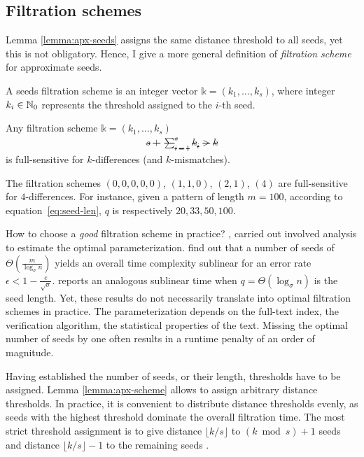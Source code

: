 \subsection{Filtration schemes}

Lemma \ref{lemma:apx-seeds} assigns the same distance threshold to all seeds, yet this is not obligatory.
Hence, I give a more general definition of \emph{filtration scheme} for approximate seeds.
\begin{definition}
A seeds filtration scheme is an integer vector $\mathbb{k} = (k_1, \dots, k_s)$, where integer $k_i \in \mathbb {N}_0$ represents the threshold assigned to the $i$-th seed.
\end{definition}

\begin{lemma}
\label{lemma:apx-scheme}
Any filtration scheme $\mathbb{k} = (k_1, \dots, k_s)$ \st
\begin{eqnarray}
s + \sum_{i=1}^s k_i > k
\end{eqnarray}
is full-sensitive for $k$-differences (and $k$-mismatches).
\end{lemma}

\begin{example}
\label{ex:seeds-apx-scheme}
The filtration schemes $(0,0,0,0,0)$, $(1,1,0)$, $(2,1)$, $(4)$ are full-sensitive for $4$-differences.
For instance, given a pattern of length $m=100$, according to equation~\ref{eq:seed-len}, $q$ is respectively $20, 33, 50, 100$.
\end{example}

How to choose a \emph{good} filtration scheme in practice?
\cite{Myers1994}, \cite{Navarro2000} carried out involved analysis to estimate the optimal parameterization. \citeauthor{Navarro2000} find out that a number of seeds of $\Theta(\frac{m}{\log_{\sigma}{n}})$ yields an overall time complexity sublinear for an error rate $\epsilon < 1 - \frac{e}{\sqrt{\sigma}}$.
\citeauthor{Myers1994} reports an analogous sublinear time when $q=\Theta(\log_{\sigma}{n})$ is the seed length.
Yet, these results do not necessarily translate into optimal filtration schemes in practice.
The parameterization depends on the full-text index, the verification algorithm, the statistical properties of the text.
Missing the optimal number of seeds by one often results in a runtime penalty of an order of magnitude.

Having established the number of seeds, or their length, thresholds have to be assigned.
Lemma \ref{lemma:apx-scheme} allows to assign arbitrary distance thresholds.
In practice, it is convenient to distribute distance thresholds evenly, as seeds with the highest threshold dominate the overall filtration time.
The most strict threshold assignment is to give distance $\lfloor k/s \rfloor$ to $(k \bmod{s}) + 1$ seeds and distance $\lfloor k/s \rfloor - 1$ to the remaining seeds \citep{Siragusa2013}.

